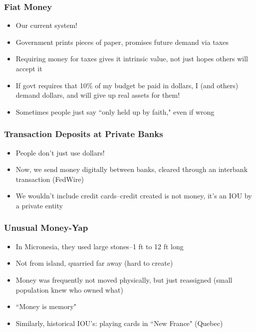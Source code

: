 \documentclass{beamer}
\begin{document}
\begin{frame}
\frametitle[alignment=center]{Fiat Money}
\begin{itemize}
\item Our current system!
\bigskip
\item Government prints pieces of paper, promises future demand via taxes
\bigskip
\item Requiring money for taxes gives it intrinsic value, not just hopes others will accept it
\bigskip
\item If govt requires that 10\% of my budget be paid in dollars, I (and others) demand dollars, and will give up real assets for them!
\bigskip
\item Sometimes people just say ``only held up by faith," even if wrong
\end{itemize}
\end{frame}

\begin{frame}
\frametitle[alignment=center]{Transaction Deposits at Private Banks}
\begin{itemize}
\item People don't just use dollars!
\bigskip
\item Now, we send money digitally between banks, cleared through an interbank transaction (FedWire)
\bigskip
\item We wouldn't include credit cards--credit created is not money, it's an IOU by a private entity
\end{itemize}
\end{frame}


\begin{frame}
\frametitle[alignment=center]{Unusual Money-Yap}
\begin{itemize}
\item In Micronesia, they used large stones--1 ft to 12 ft long
\bigskip
\item Not from island, quarried far away (hard to create)
\bigskip
\item Money was frequently not moved physically, but just reassigned (small population knew who owned what)
\bigskip
\item ``Money is memory"
\bigskip
\item Similarly, historical IOU's:  playing cards in ``New France" (Quebec)
\end{itemize}
\end{frame}
\end{document}
